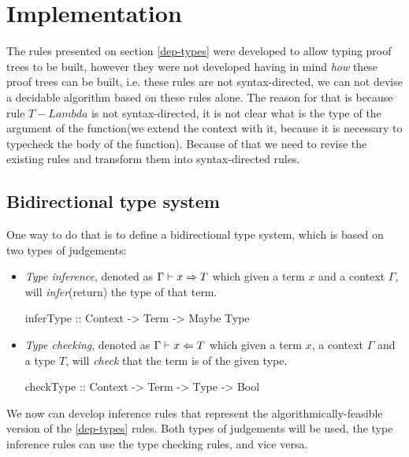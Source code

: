 \chapter{Implementation}

The rules presented on section \ref{dep-types} were developed to allow typing proof trees to be built, however they were not developed having in mind \emph{how} these proof trees can be built, i.e. these rules are not syntax-directed, we can not devise a decidable algorithm based on these rules alone.
The reason for that is because rule $T-Lambda$ is not syntax-directed, it is not clear what is the type of the argument of the function(we extend the context with it, because it is necessary to typecheck the body of the function).
Because of that we need to revise the existing rules and transform them into syntax-directed rules.

\section{Bidirectional type system}

One way to do that is to define a bidirectional type system, which is based on two types of judgements:
\begin{itemize}
       \item \emph{Type inference}, denoted as $\Gamma \vdash x \Rightarrow T$ which given a term $x$ and a context $\Gamma$, will \emph{infer}(return) the type of that term.
             \begin{haskell}
                    inferType :: Context -> Term -> Maybe Type
             \end{haskell}
       \item \emph{Type checking}, denoted as $\Gamma \vdash x \Leftarrow T$ which given a term $x$, a context $\Gamma$ and a type $T$, will \emph{check} that the term is of the given type.
             \begin{haskell}
                    checkType :: Context -> Term -> Type -> Bool
             \end{haskell}
\end{itemize}

We now can develop inference rules that represent the algorithmically-feasible version of the \ref{dep-types} rules. Both types of judgements will be used, the type inference rules can use the type checking rules, and vice versa.

